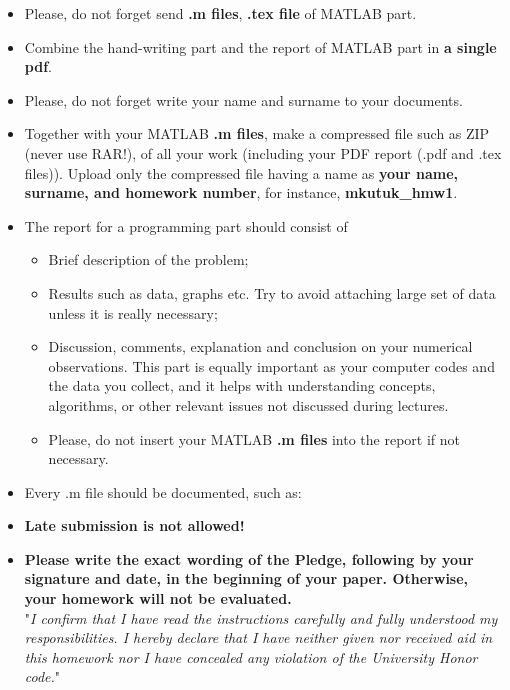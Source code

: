 \documentclass[a4paper,11pt]{article}
\begin{document}
\begin{itemize}
	\item Please, do not forget send \textbf{.m files}, \textbf{.tex file} of MATLAB part.
	\item Combine the hand-writing part and the report of MATLAB part in \textbf{a single pdf}.
    \item Please, do not forget write your name and surname to your documents.
	\item Together with your MATLAB \textbf{.m files}, make a compressed file such as ZIP (never
		use RAR!), of all your work (including your	PDF report (.pdf and .tex files)). Upload only the compressed file having a name as  \textbf{your name, surname, and homework number}, for instance, \textbf{mkutuk\_hmw1}.
	\item The report for a programming part should consist of
	\begin{itemize}
		\item Brief description of the problem;
		\item Results such as data, graphs etc. Try to avoid attaching large set of data unless it is really necessary;
		\item Discussion, comments, explanation and conclusion on your numerical observations. This part is equally important as your computer codes and the data you collect, and it helps with understanding concepts, algorithms, or other relevant issues not discussed during lectures.
         \item Please, do not insert your MATLAB \textbf{.m files} into the report if not necessary.
	\end{itemize}
	\item Every .m file should be documented, such as:
	
	\item \textbf{Late submission is not allowed!}
\item \textbf{Please write the exact wording of the Pledge, following by your signature and date, in the beginning of your paper. Otherwise, your homework will not be evaluated.} \\

\noindent "\emph{I confirm that I have read the instructions carefully and fully understood my responsibilities. I hereby declare that I have neither given nor received aid in this homework nor I have concealed any violation of the University Honor code.}"  \\
\end{itemize}

\newpage
\end{document}
